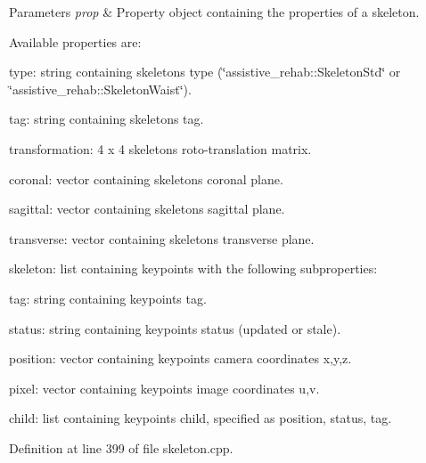 \begin{DoxyParams}{Parameters}
{\em prop} & Property object containing the properties of a skeleton.\\
\hline
\end{DoxyParams}
Available properties are\+:
\begin{DoxyItemize}
\item type\+: string containing skeleton\textquotesingle{}s type (\char`\"{}assistive\+\_\+rehab\+::\+Skeleton\+Std\char`\"{} or \char`\"{}assistive\+\_\+rehab\+::\+Skeleton\+Waist\char`\"{}).
\item tag\+: string containing skeleton\textquotesingle{}s tag.
\item transformation\+: 4 x 4 skeleton\textquotesingle{}s roto-\/translation matrix.
\item coronal\+: vector containing skeleton\textquotesingle{}s coronal plane.
\item sagittal\+: vector containing skeleton\textquotesingle{}s sagittal plane.
\item transverse\+: vector containing skeleton\textquotesingle{}s transverse plane.
\item skeleton\+: list containing keypoints with the following subproperties\+:
\begin{DoxyItemize}
\item tag\+: string containing keypoint\textquotesingle{}s tag.
\item status\+: string containing keypoint\textquotesingle{}s status (updated or stale).
\item position\+: vector containing keypoint\textquotesingle{}s camera coordinates x,y,z.
\item pixel\+: vector containing keypoint\textquotesingle{}s image coordinates u,v.
\item child\+: list containing keypoint\textquotesingle{}s child, specified as position, status, tag. 
\end{DoxyItemize}
\end{DoxyItemize}

Definition at line 399 of file skeleton.\+cpp.


